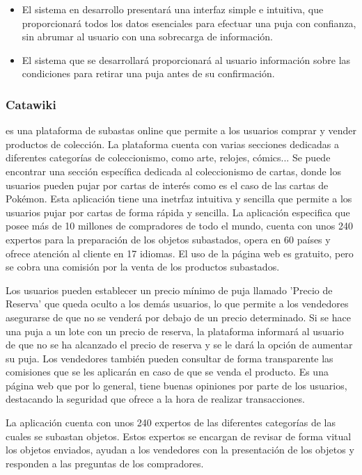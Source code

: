 \begin{itemize}
    \item El sistema en desarrollo presentará una interfaz simple e intuitiva, que proporcionará todos los datos esenciales para efectuar una puja con confianza, sin abrumar al usuario con una sobrecarga de información.
    \item El sistema que se desarrollará proporcionará al usuario información sobre las condiciones para retirar una puja antes de su confirmación.
\end{itemize}


\subsubsection{Catawiki}
 es una plataforma de subastas online que permite a los usuarios comprar y vender productos de colección. 
La plataforma cuenta con varias secciones dedicadas a diferentes categorías de coleccionismo, como arte, relojes, cómics...
Se puede encontrar una sección específica dedicada al coleccionismo de cartas, donde los usuarios pueden pujar por cartas de interés como es el caso de las cartas de Pokémon.
Esta aplicación tiene una inetrfaz intuitiva y sencilla que permite a los usuarios pujar por cartas de forma rápida y sencilla.
La aplicación especifica que posee más de 10 millones de compradores de todo el mundo, cuenta con unos 240 expertos para la preparación de los objetos subastados, opera en 60 países y ofrece atención al cliente en 17 idiomas.
El uso de la página web es gratuito, pero se cobra una comisión por la venta de los productos subastados.

Los usuarios pueden establecer un precio mínimo de puja llamado 'Precio de Reserva' que queda oculto a los demás usuarios, lo que permite a los vendedores asegurarse de que no se venderá por debajo de un precio determinado. 
Si se hace una puja a un lote con un precio de reserva, la plataforma informará al usuario de que no se ha alcanzado el precio de reserva y se le dará la opción de aumentar su puja.
Los vendedores también pueden consultar de forma transparente las comisiones que se les aplicarán en caso de que se venda el producto.
Es una página web que por lo general, tiene buenas opiniones por parte de los usuarios, destacando la seguridad que ofrece a la hora de realizar transacciones.

La aplicación cuenta con unos 240 expertos de las diferentes categorías de las cuales se subastan objetos. Estos expertos se encargan de revisar de forma vitual los objetos enviados, ayudan a los vendedores con la presentación de los objetos y responden a las preguntas de los compradores.

